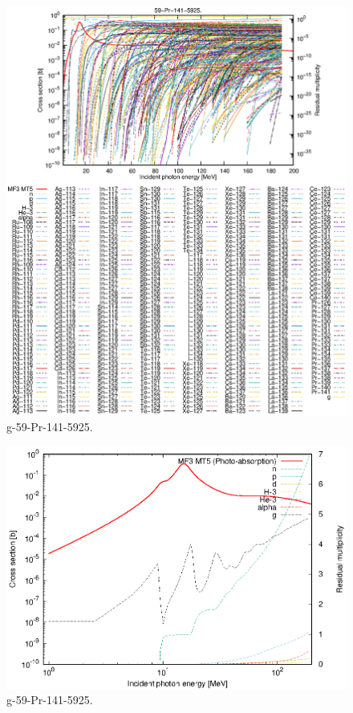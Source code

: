 \begin{figure}
 \includegraphics[width=\linewidth]{eps/g_59-Pr-141_5925.eps}
  \caption{g-59-Pr-141-5925.}
\end{figure}
\newpage \clearpage

\begin{figure}
 \includegraphics[width=\linewidth]{eps-log/g_59-Pr-141_5925.eps}
 \caption{g-59-Pr-141-5925.}
\end{figure}
\newpage \clearpage

